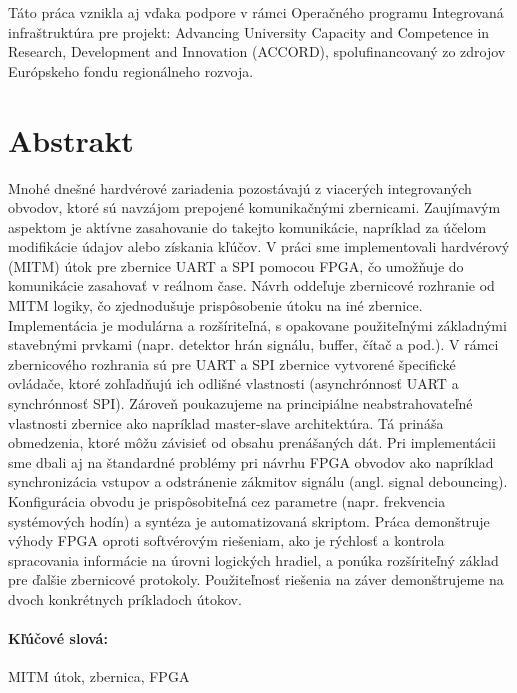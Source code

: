 \documentclass[12pt, twoside]{book}
\begin{document}
Táto práca vznikla aj vďaka podpore v rámci Operačného programu Integrovaná infraštruktúra pre projekt: Advancing University Capacity and Competence in Research, Development and Innovation (ACCORD), spolufinancovaný zo zdrojov Európskeho fondu regionálneho rozvoja.


\newpage 
\section*{Abstrakt}

Mnohé dnešné hardvérové zariadenia pozostávajú z viacerých integrovaných obvodov, ktoré sú navzájom prepojené komunikačnými zbernicami. Zaujímavým aspektom je aktívne zasahovanie do takejto komunikácie, napríklad za účelom modifikácie údajov alebo získania kľúčov. V práci sme implementovali hardvérový  (MITM) útok pre zbernice UART a SPI pomocou FPGA, čo umožňuje do komunikácie zasahovať v reálnom čase. Návrh oddeľuje zbernicové rozhranie od MITM logiky, čo zjednodušuje prispôsobenie útoku na iné zbernice. Implementácia je modulárna a rozšíriteľná, s opakovane použiteľnými základnými stavebnými prvkami (napr. detektor hrán signálu, buffer, čítač a pod.). V rámci zbernicového rozhrania sú pre UART a SPI zbernice vytvorené špecifické ovládače, ktoré zohľadňujú ich odlišné vlastnosti (asynchrónnosť UART a synchrónnosť SPI). Zároveň poukazujeme na principiálne neabstrahovateľné vlastnosti zbernice ako napríklad master-slave architektúra. Tá prináša obmedzenia, ktoré môžu závisieť od obsahu prenášaných dát. Pri implementácii sme dbali aj na štandardné problémy pri návrhu FPGA obvodov ako napríklad synchronizácia vstupov a odstránenie zákmitov signálu (angl. signal debouncing). Konfigurácia obvodu je prispôsobiteľná cez parametre (napr. frekvencia systémových hodín) a syntéza je automatizovaná skriptom. Práca demonštruje výhody FPGA oproti softvérovým riešeniam, ako je rýchlosť a kontrola spracovania informácie na úrovni logických hradiel, a ponúka rozšíriteľný základ pre ďalšie zbernicové protokoly. Použiteľnosť riešenia na záver demonštrujeme na dvoch konkrétnych príkladoch útokov.

\paragraph*{Kľúčové slová:} MITM útok, zbernica, FPGA


\newpage 
\end{document}
